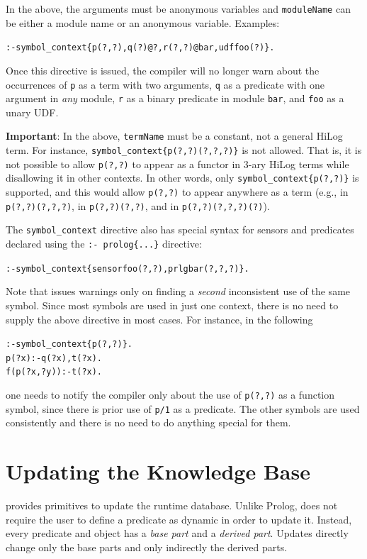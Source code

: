 \documentclass[11pt]{article}
\newcommand{\ERGO}{\mbox{\smaller{\ensuremath{\cal{E}}\smaller{{\sc{RGO}}}}}\xspace}
\newcommand{\FLSYSTEM}{\ERGO}
\begin{document}
In the above, the arguments must be anonymous variables
and \texttt{moduleName} can be either a module name or an anonymous variable.
Examples:
\begin{alltt}
    :- symbol_context\{p(?,?), q(?)@?, r(?,?)@bar, udf foo(?)\}.
\end{alltt}
Once this directive is issued, the compiler will no longer warn about the
occurrences of \texttt{p} as a term with two arguments, \texttt{q} as a
predicate with one argument in \emph{any} module, \texttt{r} as a binary
predicate in module \texttt{bar}, and \texttt{foo} as a unary UDF.      

\textbf{Important}: In the above, \texttt{termName} must be a constant, not
a general HiLog term.  For instance,
\texttt{symbol\_context\{p(?,?)(?,?,?)\}} is not allowed. That is, it is not
possible to allow \texttt{p(?,?)} to appear as a functor in 3-ary HiLog
terms while disallowing it in other contexts. In other words,
only \texttt{symbol\_context\{p(?,?)\}} is supported, and this would allow
\texttt{p(?,?)} to appear anywhere as a term (e.g., in
\texttt{p(?,?)(?,?,?)}, in \texttt{p(?,?)(?,?)}, and in
\texttt{p(?,?)(?,?,?)(?)}).

The \texttt{symbol\_context} directive also
has special syntax for sensors and predicates declared using the
\texttt{:- prolog\{...\}} directive:
\begin{alltt}
   :- symbol_context\{sensor foo(?,?), prlg bar(?,?,?)\}.
\end{alltt}

Note that \FLSYSTEM issues warnings only on finding a \emph{second}
inconsistent use of the same symbol. Since most symbols are used in just
one context, there is no need to supply the above directive  
in most cases. For instance, in the following
\begin{alltt}
    :- symbol_context\{p(?,?)\}.
    p(?x):-q(?x), t(?x).
    f(p(?x,?y)):-t(?x).
\end{alltt}
one needs to notify the compiler only about the use of \texttt{p(?,?)} as a
function symbol, since there is prior use of \texttt{p/1} as a predicate.
The other symbols are used consistently and there is no need to do anything
special for them.


\section{Updating the Knowledge Base}\label{sec-updates}


%
\FLSYSTEM provides primitives to update the runtime database. Unlike Prolog,
\FLSYSTEM does not require the user to define a predicate as dynamic in order
to update it. Instead, every predicate and object
has a \emph{base part} and a \emph{derived part}.  Updates directly change
only the base parts and only indirectly the derived parts.
\end{document}
